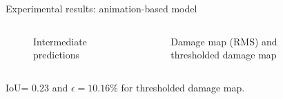 \documentclass[10pt,aspectratio=169,dvipsnames]{beamer} %
\begin{document}
\setcounter{subfigure}{0}
\begin{frame}{Experimental results: animation-based model}
		\centering
		\begin{columns}[T]		
			\begin{column}{0.32\textwidth}
				\begin{figure}
					\caption{Intermediate predictions}
				\end{figure}	
			\end{column}
		\begin{column}{0.65\textwidth}
			\begin{figure}
				\caption{Damage map (RMS) and thresholded damage map}	
			\end{figure}
		
		\end{column}
	\end{columns}
	
IoU= $0.23$ and $\epsilon=10.16\%$ for thresholded damage map.
\end{frame}
\end{document}
